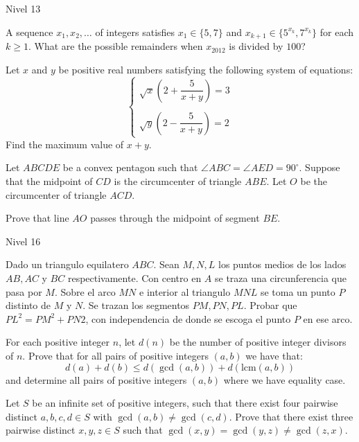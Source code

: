 \documentclass[12pt]{article}
\begin{document}
\begin{examen}{Nivel 13}{}

\begin{problema}
  A sequence $x_1, x_2, \dots$ of integers satisfies $x_1 \in \{5,7\}$
  and $x_{k+1} \in \{5^{x_k}, 7^{x_k}\}$ for each $k \ge 1$.
  What are the possible remainders when $x_{2012}$ is divided by $100$?
\end{problema}

\begin{problema}
Let \(x\) and \(y\) be positive real numbers satisfying the following system of equations:
\[
\begin{cases}
\sqrt{x}\left(2 + \dfrac{5}{x+y}\right) = 3 \\\\
\sqrt{y}\left(2 - \dfrac{5}{x+y}\right) = 2
\end{cases}
\]Find the maximum value of \(x + y\).
\end{problema}

\begin{problema}
Let $ABCDE$ be a convex pentagon such that $\angle ABC = \angle AED = 90^\circ$. Suppose that the midpoint of $CD$ is the circumcenter of triangle $ABE$. Let $O$ be the circumcenter of triangle $ACD$.

Prove that line $AO$ passes through the midpoint of segment $BE$.
\end{problema}


\end{examen}

\begin{examen}{Nivel 16}{}

\begin{problema}
Dado un triangulo equilatero $ABC$. Sean $M,N,L$ los puntos medios de los lados $AB,AC$ y $BC$ respectivamente. Con centro en $A$ se traza una circunferencia que pasa por $M$. Sobre el arco $MN$ e interior al triangulo $MNL$ se toma un punto $P$ distinto de $M$ y $N$. Se trazan los segmentos $PM,PN, PL$. Probar que $PL^2=PM^2+PN2$, con independencia de donde se escoga el punto $P$ en ese arco.
\end{problema}

\begin{problema}
For each positive integer $n$, let $d(n)$ be the number of positive integer divisors of $n$.
Prove that for all pairs of positive integers $(a,b)$ we have that:
\[ d(a)+d(b) \le d(\gcd(a,b))+d(\text{lcm}(a,b)) \]and determine all pairs of positive integers $(a,b)$ where we have equality case.
\end{problema}

\begin{problema}
	Let $S$ be an infinite set of positive integers, such that there exist four pairwise distinct $a,b,c,d \in S$ with $\gcd(a,b) \neq \gcd(c,d)$. Prove that there exist three pairwise distinct $x,y,z \in S$ such that $\gcd(x,y)=\gcd(y,z) \neq \gcd(z,x)$.
\end{problema}


\end{examen}
\end{document}
